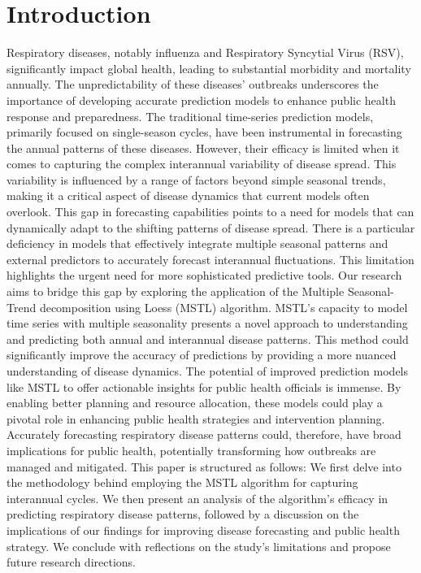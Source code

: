 \documentclass[preprint,12pt]{elsarticle}
\begin{document}
\section{Introduction}
Respiratory diseases, notably influenza and Respiratory Syncytial Virus (RSV), significantly impact global health, leading to substantial morbidity and mortality annually. 
The unpredictability of these diseases' outbreaks underscores the importance of developing accurate prediction models to enhance public health response and preparedness.
The traditional time-series prediction models, primarily focused on single-season cycles, have been instrumental in forecasting the annual patterns of these diseases. However, their efficacy is limited when it comes to capturing the complex interannual variability of disease spread. 
This variability is influenced by a range of factors beyond simple seasonal trends, making it a critical aspect of disease dynamics that current models often overlook.
This gap in forecasting capabilities points to a need for models that can dynamically adapt to the shifting patterns of disease spread. 
There is a particular deficiency in models that effectively integrate multiple seasonal patterns and external predictors to accurately forecast interannual fluctuations. 
This limitation highlights the urgent need for more sophisticated predictive tools.
Our research aims to bridge this gap by exploring the application of the Multiple Seasonal-Trend decomposition using Loess (MSTL) algorithm. 
MSTL's capacity to model time series with multiple seasonality presents a novel approach to understanding and predicting both annual and interannual disease patterns. 
This method could significantly improve the accuracy of predictions by providing a more nuanced understanding of disease dynamics.
The potential of improved prediction models like MSTL to offer actionable insights for public health officials is immense. 
By enabling better planning and resource allocation, these models could play a pivotal role in enhancing public health strategies and intervention planning. 
Accurately forecasting respiratory disease patterns could, therefore, have broad implications for public health, potentially transforming how outbreaks are managed and mitigated.
This paper is structured as follows: We first delve into the methodology behind employing the MSTL algorithm for capturing interannual cycles. 
We then present an analysis of the algorithm's efficacy in predicting respiratory disease patterns, followed by a discussion on the implications of our findings for improving disease forecasting and public health strategy. 
We conclude with reflections on the study's limitations and propose future research directions.
\end{document}
